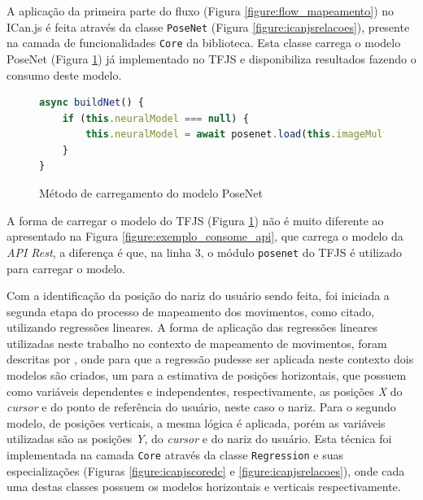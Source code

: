 
\par A aplicação da primeira parte do fluxo (Figura \ref{figure:flow_mapeamento}) no ICan.js é feita através da classe \texttt{PoseNet} (Figura \ref{figure:icanjsrelacoes}), presente na camada de funcionalidades \texttt{Core} da biblioteca. Esta classe carrega o modelo PoseNet (Figura \ref{figure:funcao_carregamento_posenet}) já implementado no TFJS e disponibiliza resultados fazendo o consumo deste modelo.

\begin{figure}[H]
    \centering
    \caption{Método de carregamento do modelo PoseNet}
    \begin{lstlisting}[language=JavaScript]
async buildNet() {
    if (this.neuralModel === null) {
        this.neuralModel = await posenet.load(this.imageMultiplier);
    }
}
    \end{lstlisting}
    \label{figure:funcao_carregamento_posenet}
\end{figure}

\par A forma de carregar o modelo do TFJS (Figura \ref{figure:funcao_carregamento_posenet}) não é muito diferente ao apresentado na Figura \ref{figure:exemplo_consome_api}, que carrega o modelo da \textit{API Rest}, a diferença é que, na linha 3, o módulo \texttt{posenet} do TFJS é utilizado para carregar o modelo.

\par Com a identificação da posição do nariz do usuário sendo feita, foi iniciada a segunda etapa do processo de mapeamento dos movimentos, como citado, utilizando regressões lineares. A forma de aplicação das regressões lineares utilizadas neste trabalho no contexto de mapeamento de movimentos, foram descritas por , onde para que a regressão pudesse ser aplicada neste contexto dois modelos são criados, um para a estimativa de posições horizontais, que possuem como variáveis dependentes e independentes, respectivamente, as posições \textit{X} do \textit{cursor} e do ponto de referência do usuário, neste caso o nariz. Para o segundo modelo, de posições verticais, a mesma lógica é aplicada, porém as variáveis utilizadas são as posições \textit{Y}, do \textit{cursor} e do nariz do usuário. Esta técnica foi implementada na camada \texttt{Core} através da classe \texttt{Regression} e suas especializações (Figuras \ref{figure:icanjscoredc} e \ref{figure:icanjsrelacoes}), onde cada uma destas classes possuem os modelos horizontais e verticais respectivamente.

